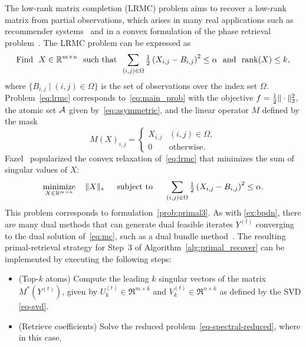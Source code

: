 \begin{example} \label{ex:mc}
  The low-rank matrix completion (LRMC) problem aims to recover a low-rank matrix from partial observations, which arises in many real applications such as recommender systems~\cite{rennie2005fast} and in a convex formulation of the phase retrieval problem~\cite{candes2013phaselift}. The LRMC problem can be expressed as 
  \begin{equation} \label{eq:lrmc}
    \mathop{\hbox{\rm Find}}\enspace X\in\mathbb{R}^{m\times n} \enspace\mathop{\hbox{\rm such that}}\enspace \sum_{(i,j) \in \Omega}\tfrac{1}{2}\left(X_{i,j} - B_{i,j}\right)^2 \leq \alpha \enspace\mathop{\hbox{\rm and}}\enspace \operatorname{rank}(X) \leq k,
  \end{equation}
  where $\{B_{i,j} \mid (i,j) \in \Omega\}$ is the set of observations over the index set $\Omega$. Problem~\eqref{eq:lrmc} corresponds to~\eqref{eq:main_prob} with the objective $f={\textstyle{\frac{1}{2}}}\|\cdot\|_2^2$, the atomic set $\mathcal{A}$ given by~\eqref{eq:asymmetric}, and the linear operator $M$ defined by the mask 
  \[ M(X)_{i,j} = 
  \begin{cases}
      X_{i,j} &(i,j) \in \Omega, \\
      0 &\mathrm{otherwise}.
  \end{cases}
  \]
  Fazel~\cite{fazel1998approximations} popularized the convex relaxation of~\eqref{eq:lrmc} that minimizes the sum of singular values of $X$:
  \begin{equation} \label{eq:mc}
  \displaystyle\mathop{\hbox{\rm minimize}}_{X\in\mathbb{R}^{m\times n}}\enspace\enspace \|X\|_*  \enspace\hbox{\quad subject to\quad}\enspace \sum_{(i,j) \in \Omega}\tfrac{1}{2}\left(X_{i,j} - B_{i,j}\right)^2 \leq \alpha.
  \end{equation}
  This problem corresponds to formulation~\eqref{prob:primal3}. As with \autoref{ex:bpdn}, there are many dual methods that can generate dual feasible iterates $Y^{(t)}$ converging to the dual solution of~\eqref{eq:mc}, such as a dual bundle method~\cite{fan2019bundle}. The resulting primal-retrieval strategy for Step~3 of Algorithm~\ref{alg:primal_recover} can be implemented by executing the following steps:
  \begin{itemize}
      \item (Top-$k$ atoms) Compute the leading $k$ singular vectors of the matrix $M^*(Y^{(t)})$, given by $U_k^{(t)} \in \Re^{m \times k}$ and $V_k^{(t)} \in \Re^{n \times k}$ as defined by the SVD \eqref{eq-svd}.
      \item (Retrieve coefficients) Solve the reduced problem~\eqref{eq-spectral-reduced}, where in this case,
      \begin{equation} \label{eq:mc_pr}

\end{equation}
\end{itemize}
\end{example}
